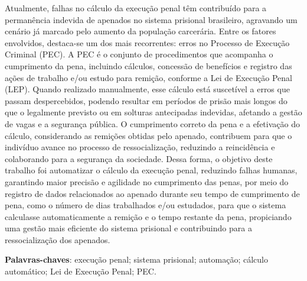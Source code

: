 \begin{resumo}
Atualmente, falhas no cálculo da execução penal têm contribuído para a permanência indevida de apenados no sistema prisional brasileiro, agravando um cenário já marcado pelo aumento da população carcerária. Entre os fatores envolvidos, destaca-se um dos mais recorrentes: erros no Processo de Execução Criminal (PEC). A PEC é o conjunto de procedimentos que acompanha o cumprimento da pena, incluindo cálculos, concessão de benefícios e registro das ações de trabalho e/ou estudo para remição, conforme a Lei de Execução Penal (LEP). Quando realizado manualmente, esse cálculo está suscetível a erros que passam despercebidos, podendo resultar em períodos de prisão mais longos do que o legalmente previsto ou em solturas antecipadas indevidas, afetando a gestão de vagas e a segurança pública. O cumprimento correto da pena e a efetivação do cálculo, considerando as remições obtidas pelo apenado, contribuem para que o indivíduo avance no processo de ressocialização, reduzindo a reincidência e colaborando para a segurança da sociedade. Dessa forma, o objetivo deste trabalho foi automatizar o cálculo da execução penal, reduzindo falhas humanas, garantindo maior precisão e agilidade no cumprimento das penas, por meio do registro de dados relacionados ao apenado durante seu tempo de cumprimento de pena, como o número de dias trabalhados e/ou estudados, para que o sistema calculasse automaticamente a remição e o tempo restante da pena, propiciando uma gestão mais eficiente do sistema prisional e contribuindo para a ressocialização dos apenados.
\vspace{\onelineskip}
\noindent

\textbf{Palavras-chaves}: execução penal; sistema prisional; automação; cálculo automático; Lei de Execução Penal; PEC.
\end{resumo}